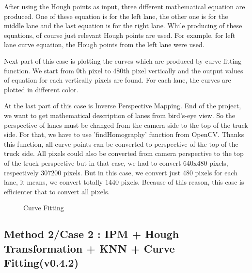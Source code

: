 After using the Hough points as input, three different mathematical equation are produced. One of these equation is for the left lane, the other one is for the middle lane and the last equation is for the right lane. While producing of these equations, of course just relevant Hough points are used. For example, for left lane curve equation, the Hough points from the left lane were used. 
 
Next part of this case is plotting the curves which are produced by curve fitting function. We start from 0th pixel to 480th pixel vertically and the output values of equation for each vertically pixels are found. For each lane, the curves are plotted in different color.  
 
At the last part of this case is Inverse Perspective Mapping. End of the project, we want to get mathematical description of lanes from bird's-eye view. So the perspective of lanes must be changed from the camera side to the top of the truck side. For that, we have to use 'findHomography' function from OpenCV. Thanks this function, all curve points can be converted to perspective of the top of the truck side. All pixels could also be converted from camera perspective to the top of the truck perspective but in that case, we had to convert 640x480 pixels, respectively 307200 pixels. But in this case, we convert just 480 pixels for each lane, it means, we convert totally 1440 pixels. Because of this reason, this case is efficienter that to convert all pixels.
 	 		 	
\begin{figure}[H]
  \centering
  \caption{Curve Fitting}
\end{figure} 



%

\subsection{Method 2/Case 2 : IPM + Hough Transformation + KNN + Curve Fitting(v0.4.2)}\label{sec:Case 2}

